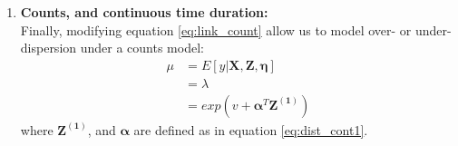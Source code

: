 \begin{enumerate}
	
	\item \textbf{Counts, and continuous time duration:} \\
	Finally, modifying equation \ref{eq:link_count} allow us to model over- or under-dispersion under a counts model:
	\begin{equation} \label{eq:link_count1}
		\begin{split}
			\mu &= E[y | \mathbf{X}, \mathbf{Z}, \pmb{\eta}] \\
			&= \lambda \\
			&= exp(v + \pmb{\alpha}^{T}\mathbf{Z^{(1)}})
		\end{split}
	\end{equation}
	where $\mathbf{Z^{(1)}}$, and $\pmb{\alpha}$ are defined as in equation \ref{eq:dist_cont1}. 

\end{enumerate}






